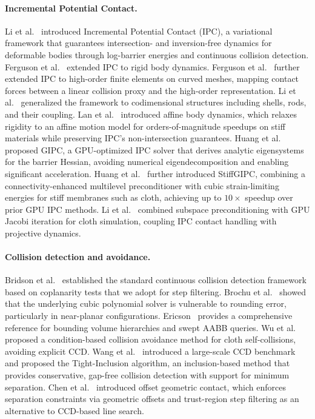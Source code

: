 \documentclass[acmtog,anonymous,review]{acmart}
\begin{document}
\paragraph{Incremental Potential Contact.}
Li et al.~\cite{li2020ipc} introduced Incremental Potential Contact
(IPC), a variational framework that guarantees intersection- and
inversion-free dynamics for deformable bodies through log-barrier
energies and continuous collision detection.
Ferguson et al.~\cite{ferguson2021ipc} extended IPC to rigid body
dynamics.
Ferguson et al.~\cite{ferguson2023highorder} further extended IPC to
high-order finite elements on curved meshes, mapping contact forces
between a linear collision proxy and the high-order representation.
Li et al.~\cite{li2021cipc} generalized the framework to
codimensional structures including shells, rods, and their coupling.
Lan et al.~\cite{lan2022abd} introduced affine body dynamics, which
relaxes rigidity to an affine motion model for orders-of-magnitude
speedups on stiff materials while preserving IPC's non-intersection
guarantees.
Huang et al.~\cite{huang2024gipc} proposed GIPC, a GPU-optimized
IPC solver that derives analytic eigensystems for the barrier
Hessian, avoiding numerical eigendecomposition and enabling
significant acceleration.
Huang et al.~\cite{huang2025stiffgipc} further introduced StiffGIPC,
combining a connectivity-enhanced multilevel preconditioner with
cubic strain-limiting energies for stiff membranes such as cloth,
achieving up to $10\times$ speedup over prior GPU IPC methods.
Li et al.~\cite{li2023subspace} combined subspace preconditioning
with GPU Jacobi iteration for cloth simulation, coupling IPC contact
handling with projective dynamics.

\paragraph{Collision detection and avoidance.}
Bridson et al.~\cite{bridson2002cloth} established the standard
continuous collision detection framework based on coplanarity tests
that we adopt for step filtering. 
Brochu et al.~\cite{brochu2012exact} showed that the underlying
cubic polynomial solver is vulnerable to rounding error, particularly
in near-planar configurations.
Ericson~\cite{ericson2004collision}
provides a comprehensive reference for bounding volume hierarchies
and swept AABB queries.
Wu et al.~\cite{wu2020repulsion} proposed a condition-based collision
avoidance method for cloth self-collisions, avoiding
explicit CCD.
Wang et al.~\cite{wang2021tightinclusion} introduced a large-scale
CCD benchmark and proposed the Tight-Inclusion algorithm, an
inclusion-based method that provides conservative, gap-free collision
detection with support for minimum separation.
Chen et al.~\cite{chen2025ogc} introduced offset geometric contact,
which enforces separation constraints via geometric offsets and
trust-region step filtering as an alternative to
CCD-based line search.
\end{document}
